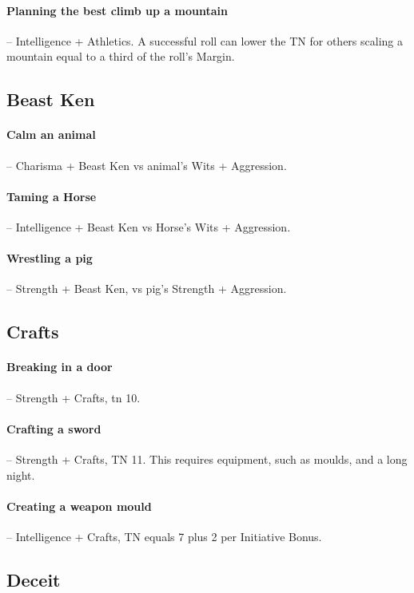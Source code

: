 \begin{multicols}{2}
\paragraph{Planning the best climb up a mountain} -- Intelligence + Athletics.
A successful roll can lower the TN for others scaling a mountain equal to a third of the roll's Margin.

\subsection{Beast Ken}

\paragraph{Calm an animal} -- Charisma + Beast Ken vs animal's Wits + Aggression.

\paragraph{Taming a Horse} -- Intelligence + Beast Ken vs Horse's Wits + Aggression.

\paragraph{Wrestling a pig} -- Strength + Beast Ken, vs pig's Strength + Aggression.

\subsection{Crafts}

\paragraph{Breaking in a door} -- Strength + Crafts, \gls{tn} 10.

\paragraph{Crafting a sword} -- Strength + Crafts, TN 11.
This requires equipment, such as moulds, and a long night.

\paragraph{Creating a weapon mould} -- Intelligence + Crafts, TN equals 7 plus 2 per Initiative Bonus.

\subsection{Deceit}


\end{multicols}
